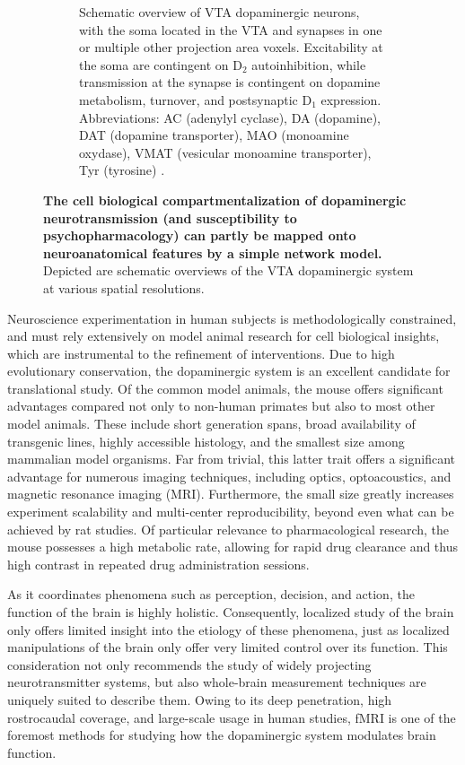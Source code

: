 \begin{sansmath}
\begin{figure}[h!]
\begin{subfigure}{.985\textwidth}
		\caption{
			Schematic overview of VTA dopaminergic neurons, with the soma located in the VTA and synapses in one or multiple other projection area voxels.
			Excitability at the soma are contingent on $\mathrm{D_2}$ autoinhibition, while transmission at the synapse is contingent on dopamine metabolism, turnover, and postsynaptic $\mathrm{D_1}$ expression.
			Abbreviations: AC (adenylyl cyclase), DA (dopamine), DAT (dopamine transporter), MAO (monoamine oxydase), VMAT (vesicular monoamine transporter), Tyr (tyrosine) \cite{Torres2003}.
			}
		\label{fig:cm}
	\end{subfigure}
	\caption{
		\textbf{The cell biological compartmentalization of dopaminergic neurotransmission (and susceptibility to psychopharmacology) can partly be mapped onto neuroanatomical features by a simple network model.}
		Depicted are schematic overviews of the VTA dopaminergic system at various spatial resolutions.
		}
	\label{fig:m}
\end{figure}
\end{sansmath}

Neuroscience experimentation in human subjects is methodologically constrained, and must rely extensively on model animal research for cell biological insights, which are instrumental to the refinement of interventions.
Due to high evolutionary conservation, the dopaminergic system is an excellent candidate for translational study.
Of the common model animals, the mouse offers significant advantages compared not only to non-human primates but also to most other model animals.
These include short generation spans, broad availability of transgenic lines, highly accessible histology, and the smallest size among mammalian model organisms.
Far from trivial, this latter trait offers a significant advantage for numerous imaging techniques, including optics, optoacoustics, and magnetic resonance imaging (MRI).
Furthermore, the small size greatly increases experiment scalability and multi-center reproducibility, beyond even what can be achieved by rat studies.
Of particular relevance to pharmacological research, the mouse possesses a high metabolic rate, allowing for rapid drug clearance and thus high contrast in repeated drug administration sessions.

As it coordinates phenomena such as perception, decision, and action, the function of the brain is highly holistic.
Consequently, localized study of the brain only offers limited insight into the etiology of these phenomena, just as localized manipulations of the brain only offer very limited control over its function.
This consideration not only recommends the study of widely projecting neurotransmitter systems, but also whole-brain measurement techniques are uniquely suited to describe them.
Owing to its deep penetration, high rostrocaudal coverage, and large-scale usage in human studies, fMRI is one of the foremost methods for studying how the dopaminergic system modulates brain function.

